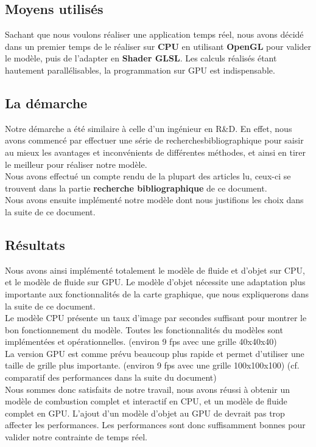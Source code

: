 \documentclass[a4paper,10pt]{article}
\begin{document}
\subsection{Moyens utilisés}
Sachant que nous voulons réaliser une application temps réel, nous avons décidé dans 
un premier temps de le réaliser sur \textbf{CPU} en utilisant \textbf{OpenGL} pour valider le modèle, 
puis de l'adapter en \textbf{Shader GLSL}. Les calculs réalisés étant hautement 
parallélisables, la programmation sur GPU est indispensable.

\subsection{La démarche}
Notre démarche a été similaire à celle d'un ingénieur en R\&D. En effet, nous avons commencé par effectuer une série de recherchesbibliographique pour saisir au mieux les avantages et inconvénients de différentes
méthodes, et ainsi en tirer le meilleur pour réaliser notre modèle.\\
Nous avons effectué un compte rendu de la plupart des articles lu, ceux-ci
se trouvent dans la partie \textbf{recherche bibliographique} de ce document.\\
Nous avons ensuite implémenté notre modèle dont nous justifions les choix
dans la suite de ce document.


\subsection{Résultats}
Nous avons ainsi implémenté totalement le modèle de fluide et d'objet sur CPU, 
et le modèle de fluide sur GPU. Le modèle d'objet nécessite une adaptation plus
importante aux fonctionnalités de la carte graphique, que nous expliquerons 
dans la suite de ce document.\\
Le modèle CPU présente un taux d'image par secondes suffisant pour montrer 
le bon fonctionnement du modèle. Toutes les fonctionnalités du modèles sont
implémentées et opérationnelles. (environ 9 fps avec une grille 40x40x40)\\
La version GPU est comme prévu beaucoup plus rapide et permet d'utiliser
une taille de grille plus importante. (environ 9 fps avec une grille 100x100x100)  (cf. comparatif des performances
dans la suite du document)\\
Nous sommes donc satisfaits de notre travail, nous avons réussi à obtenir un modèle de combustion complet et interactif en CPU,
et un modèle de fluide complet en GPU. L'ajout d'un modèle 
d'objet au GPU de devrait pas trop affecter les performances. Les performances sont 
donc suffisamment bonnes pour valider notre contrainte de temps réel.\\
\end{document}

